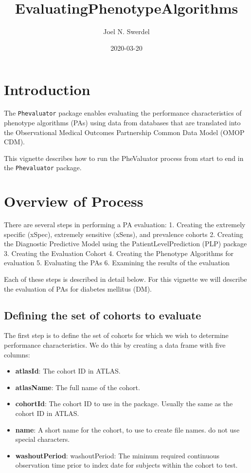 \documentclass[
]{article}
\title{EvaluatingPhenotypeAlgorithms}
\author{Joel N. Swerdel}
\date{2020-03-20}
\providecommand{\tightlist}{%
  \setlength{\itemsep}{0pt}\setlength{\parskip}{0pt}}
\begin{document}
\maketitle

{
\setcounter{tocdepth}{3}
\tableofcontents
}
\newpage

\hypertarget{introduction}{%
\section{Introduction}\label{introduction}}

The \texttt{Phevaluator} package enables evaluating the performance
characteristics of phenotype algorithms (PAs) using data from databases
that are translated into the Observational Medical Outcomes Partnership
Common Data Model (OMOP CDM).

This vignette describes how to run the PheValuator process from start to
end in the \texttt{Phevaluator} package.

\hypertarget{overview-of-process}{%
\section{Overview of Process}\label{overview-of-process}}

There are several steps in performing a PA evaluation: 1. Creating the
extremely specific (xSpec), extremely sensitive (xSens), and prevalence
cohorts 2. Creating the Diagnostic Predictive Model using the
PatientLevelPrediction (PLP) package 3. Creating the Evaluation Cohort
4. Creating the Phenotype Algorithms for evaluation 5. Evaluating the
PAs 6. Examining the results of the evaluation

Each of these steps is described in detail below. For this vignette we
will describe the evaluation of PAs for diabetes mellitus (DM).

\hypertarget{defining-the-set-of-cohorts-to-evaluate}{%
\subsection{Defining the set of cohorts to
evaluate}\label{defining-the-set-of-cohorts-to-evaluate}}

The first step is to define the set of cohorts for which we wish to
determine performance characteristics. We do this by creating a data
frame with five columns:

\begin{itemize}
\tightlist
\item
  \textbf{atlasId}: The cohort ID in ATLAS.
\item
  \textbf{atlasName}: The full name of the cohort.
\item
  \textbf{cohortId}: The cohort ID to use in the package. Usually the
  same as the cohort ID in ATLAS.
\item
  \textbf{name}: A short name for the cohort, to use to create file
  names. do not use special characters.
\item
  \textbf{washoutPeriod}: washoutPeriod: The mininum required continuous
  observation time prior to index date for subjects within the cohort to
  test.
\end{itemize}
\end{document}
